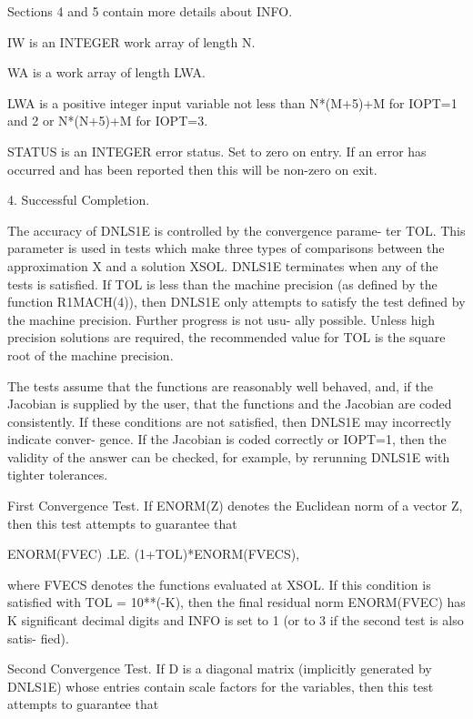 \documentclass[11pt,twoside,nolof]{starlink}
\begin{document}
\begin{terminalv}
         Sections 4 and 5 contain more details about INFO.

       IW is an INTEGER work array of length N.

       WA is a work array of length LWA.

       LWA is a positive integer input variable not less than
         N*(M+5)+M for IOPT=1 and 2 or N*(N+5)+M for IOPT=3.

       STATUS is an INTEGER error status. Set to zero on entry.
              If an error has occurred and has been reported then
              this will be non-zero on exit.


 4. Successful Completion.

       The accuracy of DNLS1E is controlled by the convergence parame-
       ter TOL.  This parameter is used in tests which make three types
       of comparisons between the approximation X and a solution XSOL.
       DNLS1E terminates when any of the tests is satisfied.  If TOL is
       less than the machine precision (as defined by the function
       R1MACH(4)), then DNLS1E only attempts to satisfy the test
       defined by the machine precision.  Further progress is not usu-
       ally possible.  Unless high precision solutions are required,
       the recommended value for TOL is the square root of the machine
       precision.

       The tests assume that the functions are reasonably well behaved,
       and, if the Jacobian is supplied by the user, that the functions
       and the Jacobian are coded consistently.  If these conditions
       are not satisfied, then DNLS1E may incorrectly indicate conver-
       gence.  If the Jacobian is coded correctly or IOPT=1,
       then the validity of the answer can be checked, for example, by
       rerunning DNLS1E with tighter tolerances.

       First Convergence Test.  If ENORM(Z) denotes the Euclidean norm
         of a vector Z, then this test attempts to guarantee that

               ENORM(FVEC) .LE. (1+TOL)*ENORM(FVECS),

         where FVECS denotes the functions evaluated at XSOL.  If this
         condition is satisfied with TOL = 10**(-K), then the final
         residual norm ENORM(FVEC) has K significant decimal digits and
         INFO is set to 1 (or to 3 if the second test is also satis-
         fied).

       Second Convergence Test.  If D is a diagonal matrix (implicitly
         generated by DNLS1E) whose entries contain scale factors for
         the variables, then this test attempts to guarantee that


\end{terminalv}
\end{document}
